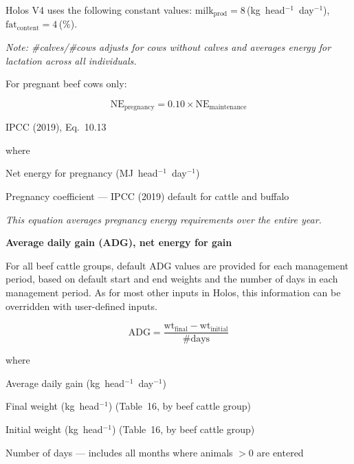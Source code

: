 \noindent Holos V4 uses the following constant values:
$\mathrm{milk}_{\mathrm{prod}} = 8$\,(kg~head$^{-1}$~day$^{-1}$),
$\mathrm{fat}_{\mathrm{content}} = 4$\,(\%).

\noindent\textit{Note: \#calves/\#cows adjusts for cows without calves and
averages energy for lactation across all individuals.}

\noindent For pregnant beef cows only:

\begin{equation}
    \mathrm{NE}_{\mathrm{pregnancy}} = 0.10 \times \mathrm{NE}_{\mathrm{maintenance}}
    \tag{Eq.\ 3.1.1.6}
\end{equation}

\noindent IPCC (2019), Eq.~10.13

\noindent where
\begin{description}[font=\normalfont, leftmargin=9em, style=sameline, nosep]
    \item[$\mathrm{NE}_{\mathrm{pregnancy}}$] Net energy for pregnancy
          (MJ~head$^{-1}$~day$^{-1}$)
    \item[$0.1$] Pregnancy coefficient --- IPCC (2019) default for cattle and buffalo
\end{description}

\noindent\textit{This equation averages pregnancy energy requirements over the
entire year.}

\bigskip
\noindent\textbf{Average daily gain (ADG), net energy for gain}

For all beef cattle groups, default ADG values are provided for each management period,
based on default start and end weights and the number of days in each management period.
As for most other inputs in Holos, this information can be overridden with user-defined
inputs.

\begin{equation}
    \mathrm{ADG} = \frac{\mathrm{wt}_{\mathrm{final}} - \mathrm{wt}_{\mathrm{initial}}}
                        {\#\mathrm{days}}
    \tag{Eq.\ 3.1.1.7}
\end{equation}

\noindent where
\begin{description}[font=\normalfont, leftmargin=9em, style=sameline, nosep]
    \item[$\mathrm{ADG}$] Average daily gain (kg~head$^{-1}$~day$^{-1}$)
    \item[$\mathrm{wt}_{\mathrm{final}}$] Final weight (kg~head$^{-1}$) (Table~16,
          by beef cattle group)
    \item[$\mathrm{wt}_{\mathrm{initial}}$] Initial weight (kg~head$^{-1}$) (Table~16,
          by beef cattle group)
    \item[$\#\mathrm{days}$] Number of days --- includes all months where animals
          $>0$ are entered
\end{description}

